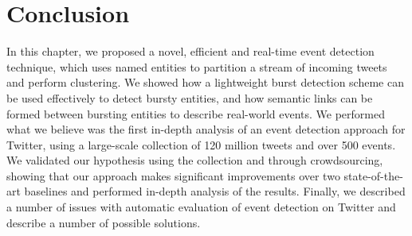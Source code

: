 
\section{Conclusion}
In this chapter, we proposed a novel, efficient and real-time event detection technique, which uses named entities to partition a stream of incoming tweets and perform clustering.
We showed how a lightweight burst detection scheme can be used effectively to detect bursty entities, and how semantic links can be formed between bursting entities to describe real-world events.
We performed what we believe was the first in-depth analysis of an event detection approach for Twitter, using a large-scale collection of 120 million tweets and over 500 events.
We validated our hypothesis using the collection and through crowdsourcing, showing that our approach makes significant improvements over two state-of-the-art baselines and performed in-depth analysis of the results.
Finally, we described a number of issues with automatic evaluation of event detection on Twitter and describe a number of possible solutions.
